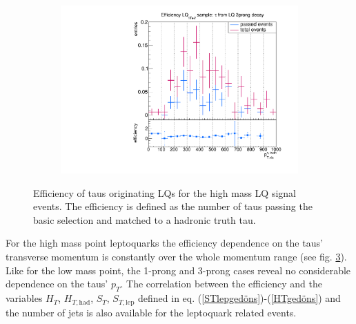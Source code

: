 \begin{figure}
\begin{subfigure}[t]{0.49\textwidth}
                \label{DividedfromLQ:signal:1prongLQ76}
                \end{subfigure}
                \begin{subfigure}[t]{0.49\textwidth}
                \includegraphics[width=\textwidth]{figures/plots/LQ76/Divided_fromLQ3prong.pdf}
                \label{DividedfromLQ:signal:3prongLQ76}
                \end{subfigure}            
\caption[Efficiency of taus originating LQs for the high mass LQ signal events.]{Efficiency of taus originating LQs for the high mass LQ signal events. The efficiency is defined as the number of taus passing the basic selection and matched to a hadronic truth tau.}
\label{DividedFromLQ:signal:LQ76}
\end{figure}
%
For the high mass point leptoquarks the efficiency dependence on the taus' transverse momentum is constantly over the whole momentum range (see fig. \ref{DividedFromLQ:signal:LQ76}). Like for the low mass point, the 1-prong and 3-prong cases reveal no considerable dependence on the taus' $p_T$. 
The correlation between the efficiency and the variables $H_T$, $H_{T,\text{had}}$, $S_T$, $S_{T,\text{lep}}$ defined in eq. (\ref{STlepgedöns})-(\ref{HTgedöns}) and the number of jets is also available for the leptoquark related events. \newline
